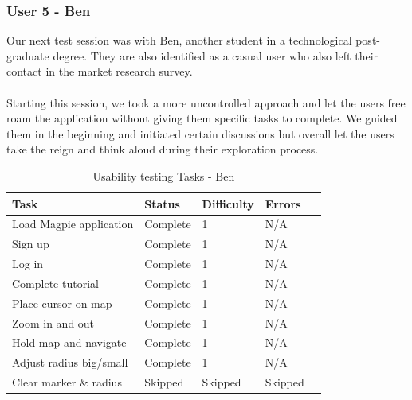 \subsubsection{User 5 - Ben}
Our next test session was with Ben, another student in a technological post-graduate degree. They are also identified as a casual user who also left their contact in the market research survey.\\ \\
Starting this session, we took a more uncontrolled approach and let the users free roam the application without giving them specific tasks to complete. We guided them in the beginning and initiated certain discussions but overall let the users take the reign and think aloud during their exploration process.\\
\begin{table}[h!]
    \centering
    \caption{Usability testing Tasks - Ben}
    \begin{tabular}{|p{}|p{}|p{}|p{}|p{}|}
        \hline
        \textbf{Task}                 & \textbf{Status} & \textbf{Difficulty} & \textbf{Errors} \\
        \hline
        Load Magpie application       & Complete        & 1                   & N/A             \\
        \hline
        Sign up                       & Complete        & 1                   & N/A             \\
        \hline
        Log in                        & Complete        & 1                   & N/A             \\
        \hline
        Complete tutorial             & Complete        & 1                   & N/A             \\
        \hline
        Place cursor on map           & Complete        & 1                   & N/A             \\
        \hline
        Zoom in and out               & Complete        & 1                   & N/A             \\
        \hline
        Hold map and navigate         & Complete        & 1                   & N/A             \\
        \hline
        Adjust radius big/small       & Complete        & 1                   & N/A             \\
        \hline
        Clear marker \& radius        & Skipped         & Skipped             & Skipped         \\

\end{tabular}
\end{table}
